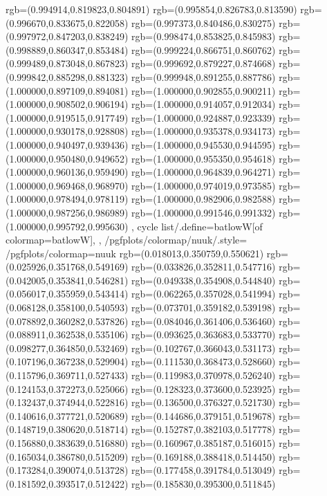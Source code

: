 {{{			rgb=(0.994914,0.819823,0.804891)
			rgb=(0.995854,0.826783,0.813590)
			rgb=(0.996670,0.833675,0.822058)
			rgb=(0.997373,0.840486,0.830275)
			rgb=(0.997972,0.847203,0.838249)
			rgb=(0.998474,0.853825,0.845983)
			rgb=(0.998889,0.860347,0.853484)
			rgb=(0.999224,0.866751,0.860762)
			rgb=(0.999489,0.873048,0.867823)
			rgb=(0.999692,0.879227,0.874668)
			rgb=(0.999842,0.885298,0.881323)
			rgb=(0.999948,0.891255,0.887786)
			rgb=(1.000000,0.897109,0.894081)
			rgb=(1.000000,0.902855,0.900211)
			rgb=(1.000000,0.908502,0.906194)
			rgb=(1.000000,0.914057,0.912034)
			rgb=(1.000000,0.919515,0.917749)
			rgb=(1.000000,0.924887,0.923339)
			rgb=(1.000000,0.930178,0.928808)
			rgb=(1.000000,0.935378,0.934173)
			rgb=(1.000000,0.940497,0.939436)
			rgb=(1.000000,0.945530,0.944595)
			rgb=(1.000000,0.950480,0.949652)
			rgb=(1.000000,0.955350,0.954618)
			rgb=(1.000000,0.960136,0.959490)
			rgb=(1.000000,0.964839,0.964271)
			rgb=(1.000000,0.969468,0.968970)
			rgb=(1.000000,0.974019,0.973585)
			rgb=(1.000000,0.978494,0.978119)
			rgb=(1.000000,0.982906,0.982588)
			rgb=(1.000000,0.987256,0.986989)
			rgb=(1.000000,0.991546,0.991332)
			rgb=(1.000000,0.995792,0.995630)
		},
	cycle list/.define={batlowW}{[of colormap=batlowW]},
	},
	/pgfplots/colormap/nuuk/.style={
		/pgfplots/colormap={nuuk}{%
			rgb=(0.018013,0.350759,0.550621)
			rgb=(0.025926,0.351768,0.549169)
			rgb=(0.033826,0.352811,0.547716)
			rgb=(0.042005,0.353841,0.546281)
			rgb=(0.049338,0.354908,0.544840)
			rgb=(0.056017,0.355959,0.543414)
			rgb=(0.062265,0.357028,0.541994)
			rgb=(0.068128,0.358100,0.540593)
			rgb=(0.073701,0.359182,0.539198)
			rgb=(0.078892,0.360282,0.537826)
			rgb=(0.084046,0.361406,0.536460)
			rgb=(0.088911,0.362538,0.535106)
			rgb=(0.093625,0.363683,0.533770)
			rgb=(0.098277,0.364850,0.532469)
			rgb=(0.102767,0.366043,0.531173)
			rgb=(0.107196,0.367238,0.529904)
			rgb=(0.111530,0.368473,0.528660)
			rgb=(0.115796,0.369711,0.527433)
			rgb=(0.119983,0.370978,0.526240)
			rgb=(0.124153,0.372273,0.525066)
			rgb=(0.128323,0.373600,0.523925)
			rgb=(0.132437,0.374944,0.522816)
			rgb=(0.136500,0.376327,0.521730)
			rgb=(0.140616,0.377721,0.520689)
			rgb=(0.144686,0.379151,0.519678)
			rgb=(0.148719,0.380620,0.518714)
			rgb=(0.152787,0.382103,0.517778)
			rgb=(0.156880,0.383639,0.516880)
			rgb=(0.160967,0.385187,0.516015)
			rgb=(0.165034,0.386780,0.515209)
			rgb=(0.169188,0.388418,0.514450)
			rgb=(0.173284,0.390074,0.513728)
			rgb=(0.177458,0.391784,0.513049)
			rgb=(0.181592,0.393517,0.512422)
			rgb=(0.185830,0.395300,0.511845)
}}}
